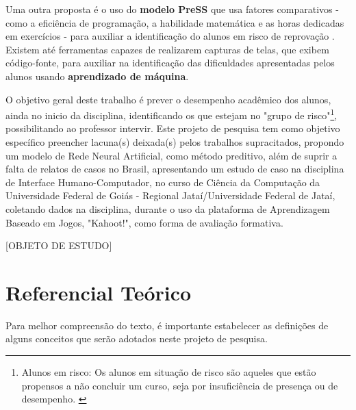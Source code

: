 \documentclass[
	12pt,				%
	openright,			%
	oneside,
	a4paper,			%
	english,			%
	french,				%
	spanish,			%
	brazil,				%
	]{abntex2}
\begin{document}
 Uma outra proposta é o uso do \textbf{modelo PreSS} que usa fatores comparativos - como a eficiência de programação, a habilidade matemática  e as horas dedicadas em exercícios - para auxiliar a identificação do alunos em risco de reprovação \cite{quille2018}. Existem até ferramentas capazes de realizarem capturas de telas, que exibem código-fonte, para auxiliar na identificação das dificuldades apresentadas pelos alunos usando \textbf{aprendizado de máquina}\cite{ahadi2016early}.
 
O objetivo geral deste trabalho é prever o desempenho acadêmico dos alunos, ainda no inicio da disciplina, identificando os que estejam no "grupo de risco"\footnote{Alunos em risco: Os alunos em situação de risco são aqueles que estão propensos a não concluir um curso, seja por insuficiência de presença ou de desempenho. \cite{da2014alunos}}, possibilitando ao professor intervir. Este projeto de pesquisa tem como objetivo específico preencher lacuna(s) deixada(s) pelos trabalhos supracitados, propondo um modelo de Rede Neural Artificial, como método preditivo, além de suprir a falta de relatos de casos no Brasil, apresentando um estudo de caso na disciplina de Interface Humano-Computador, no curso de Ciência da Computação da Universidade Federal de Goiás - Regional Jataí/Universidade Federal de Jataí, coletando dados na disciplina, durante o uso da plataforma de Aprendizagem Baseado em Jogos, "Kahoot!", como forma de avaliação formativa.

{\color{red}[OBJETO DE ESTUDO]}

\chapter{Referencial Teórico}
Para melhor compreensão do texto, é importante estabelecer as definições de alguns conceitos que serão adotados neste projeto de pesquisa. 
\end{document}
